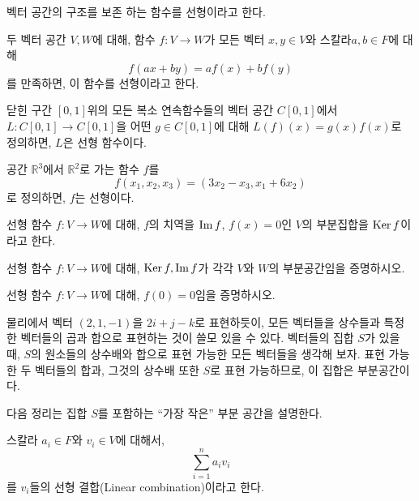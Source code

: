 벡터 공간의 구조를 보존 하는 함수를 선형이라고 한다.
\begin{definition}
    두 벡터 공간 $V, W$에 대해, 함수 $f : V \to W$가 모든 벡터 $x, y \in V$와 스칼라$a, b \in F$에 대해
    \begin{equation*}
        f(ax + by) = af(x) + bf(y)
    \end{equation*}
    를 만족하면, 이 함수를 선형이라고 한다.  
\end{definition}
\begin{example}
    닫힌 구간 $[0, 1]$위의 모든 복소 연속함수들의 벡터 공간 $C[0, 1]$에서 $L : C[0, 1] \to C[0, 1]$을 어떤 $g \in C[0,1]$에 대해 $L(f) (x) = g(x)f(x)$로 정의하면, $L$은 선형 함수이다.
\end{example}
\begin{example}
    공간 $\mathbb{R}^3$에서 $\mathbb{R}^2$로 가는 함수 $f$를 
    \begin{equation*}
        f(x_1, x_2, x_3) = (3x_2 - x_3, x_1 + 6x_2)
    \end{equation*}
    로 정의하면, $f$는 선형이다.
\end{example}

\begin{definition}
    선형 함수 $f: V \to W$에 대해, $f$의 치역을 $\operatorname{Im} f$, $f(x) = 0$인 $V$의 부분집합을 $\operatorname{Ker} f$이라고 한다.
\end{definition}
\begin{exercise}
    선형 함수 $f: V \to W$에 대해, $\operatorname{Ker} f, \operatorname{Im} f$가 각각 $V$와 $W$의 부분공간임을 증명하시오.
\end{exercise}
\begin{exercise}
    선형 함수 $f: V \to W$에 대해, $f(0) = 0$임을 증명하시오.
\end{exercise}

물리에서 벡터 $(2, 1, -1)$을 $2i + j - k$로 표현하듯이, 모든 벡터들을 상수들과 특정한 벡터들의 곱과 합으로 표현하는 것이 쓸모 있을 수 있다.
벡터들의 집합 $S$가 있을 때, $S$의 원소들의 상수배와 합으로 표현 가능한 모든 벡터들을 생각해 보자.
표현 가능한 두 벡터들의 합과, 그것의 상수배 또한 $S$로 표현 가능하므로, 이 집합은 부분공간이다.

다음 정리는 집합 $S$를 포함하는 ``가장 작은'' 부분 공간을 설명한다.

\begin{definition}
    스칼라 $a_i \in F$와 $v_i \in V$에 대해서,
    \begin{equation*}
        \sum_{i = 1}^n a_i v_i
    \end{equation*}
    를 $v_i$들의 선형 결합(Linear combination)이라고 한다.  
\end{definition}

